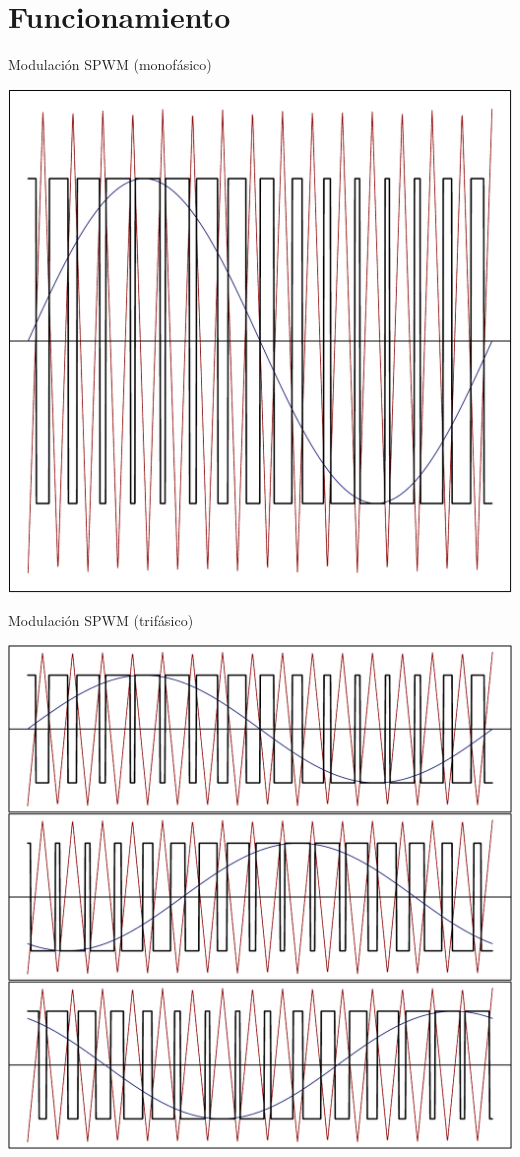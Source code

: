 \documentclass[aspectratio=169, usenames,svgnames,dvipsnames]{beamer}
\begin{document}
\section{Funcionamiento}
\label{sec:orge667dce}

\begin{frame}[label={sec:org7db7a2d}]{Modulación SPWM (monofásico)}
\begin{center}
\includegraphics[height=0.9\textheight]{../figs/SPWMMonofasico.pdf}
\end{center}
\end{frame}
\begin{frame}[label={sec:org078517c}]{Modulación SPWM (trifásico)}
\begin{center}
\includegraphics[height=0.9\textheight]{../figs/SPWMTrifasico.pdf}
\end{center}
\end{frame}
\end{document}
